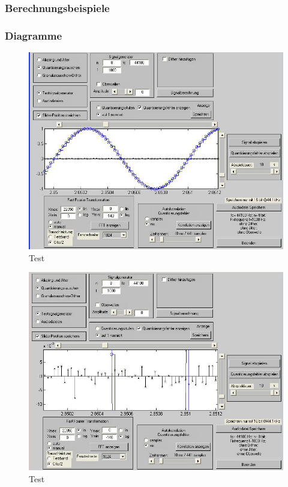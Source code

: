 \subsubsection{Berechnungsbeispiele}

\subsubsection{Diagramme}

\begin{figure}[h!]
\centering
\includegraphics[width=\columnwidth]{figures/Aufg1/2_1_1.JPG} 
\caption{Test}
\end{figure}

\begin{figure}[h!]
\centering
\includegraphics[width=\columnwidth]{figures/Aufg1/2_1_3.JPG} 
\caption{Test}
\end{figure}

